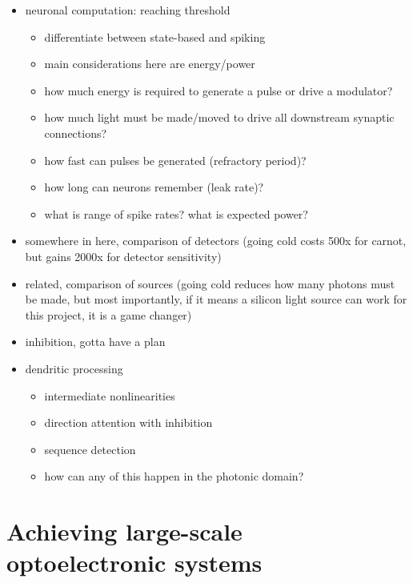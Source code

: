 \documentclass[twocolumn]{article}
\begin{document}
\begin{itemize}
\item neuronal computation: reaching threshold
\begin{itemize}
\item differentiate between state-based and spiking
\item main considerations here are energy/power
\item how much energy is required to generate a pulse or drive a modulator? 
\item how much light must be made/moved to drive all downstream synaptic connections? 
\item how fast can pulses be generated (refractory period)? 
\item how long can neurons remember (leak rate)? 
\item what is range of spike rates? what is expected power?
\end{itemize}

\item somewhere in here, comparison of detectors (going cold costs 500x for carnot, but gains 2000x for detector sensitivity)
\item related, comparison of sources (going cold reduces how many photons must be made, but most importantly, if it means a silicon light source can work for this project, it is a game changer)

\item inhibition, gotta have a plan

\item dendritic processing
\begin{itemize}
\item intermediate nonlinearities
\item direction attention with inhibition
\item sequence detection
\item how can any of this happen in the photonic domain?
\end{itemize}

\end{itemize}

\section{\label{sec:scaling}Achieving large-scale optoelectronic systems}
\end{document}
